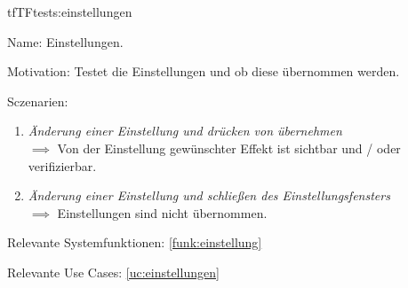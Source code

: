 \begin{description}[leftmargin=5em, style=sameline]
\begin{lhp}{tf}{TF}{tests:einstellungen}
	\item [Name:] Einstellungen.
	\item [Motivation:] Testet die Einstellungen und ob diese übernommen werden.
	\item [Sczenarien:] \hfill
		\begin{enumerate}
			\item \textit{Änderung einer Einstellung und drücken von übernehmen} \\ $\implies$ Von der Einstellung gewünschter Effekt ist sichtbar und / oder verifizierbar.
			\item \textit{Änderung einer Einstellung und schließen des Einstellungsfensters} \\ $\implies$ Einstellungen sind nicht übernommen.
		\end{enumerate}
	\item [Relevante Systemfunktionen:] \ref{funk:einstellung}
	\item [Relevante Use Cases:] \ref{uc:einstellungen}
\end{lhp}

\end{description}